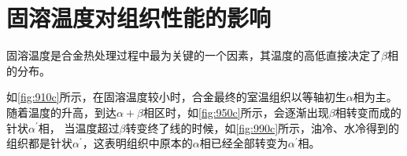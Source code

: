 \section{固溶温度对组织性能的影响}
固溶温度是\ti 合金热处理过程中最为关键的一个因素，其温度的高低直接决定了$\beta$相的分布。

如\ref{fig:910c}所示，在固溶温度较小时，合金最终的室温组织以等轴初生$\alpha$相为主。随着温度的升高，到达$\alpha+\beta$相区时，如\ref{fig:950c}所示，会逐渐出现$\beta$相转变而成的针状$\alpha^\prime$相，%
当温度超过$\beta $转变终了线的时候，如\ref{fig:990c}所示，油冷、水冷得到的组织都是针状$\alpha^\prime$，这表明组织中原本的$\alpha$相已经全部转变为$\alpha^\prime$相。

